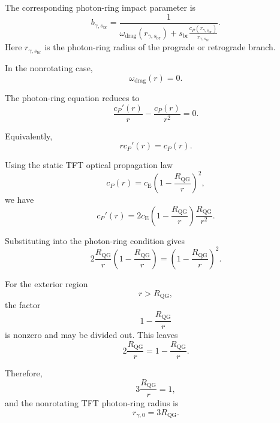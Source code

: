 The corresponding photon-ring impact parameter is
\begin{equation}
    \boxed{ b_{\gamma,s_{\mathrm{br}}} = \frac{1}{ \omega_{\mathrm{drag}}(r_{\gamma,s_{\mathrm{br}}}) + s_{\mathrm{br}}\frac{c_P(r_{\gamma,s_{\mathrm{br}}})}{r_{\gamma,s_{\mathrm{br}}}} }. }
\end{equation}
Here $r_{\gamma,s_{\mathrm{br}}}$ is the photon-ring radius of the prograde or retrograde branch.

In the nonrotating case,
\begin{equation}
    \omega_{\mathrm{drag}}(r) = 0.
\end{equation}

The photon-ring equation reduces to
\begin{equation}
    \frac{c_P'(r)}{r} - \frac{c_P(r)}{r^2} = 0.
\end{equation}

Equivalently,
\begin{equation}
    r c_P'(r) = c_P(r).
\end{equation}

Using the static TFT optical propagation law
\begin{equation}
    c_P(r) = c_{\mathrm{E}} \left( 1-\frac{R_{\mathrm{QG}}}{r} \right)^2,
\end{equation}
we have
\begin{equation}
    c_P'(r) = 2c_{\mathrm{E}} \left( 1-\frac{R_{\mathrm{QG}}}{r} \right) \frac{R_{\mathrm{QG}}}{r^2}.
\end{equation}

Substituting into the photon-ring condition gives
\begin{equation}
    2 \frac{R_{\mathrm{QG}}}{r} \left( 1-\frac{R_{\mathrm{QG}}}{r} \right) = \left( 1-\frac{R_{\mathrm{QG}}}{r} \right)^2.
\end{equation}

For the exterior region
\begin{equation}
    r > R_{\mathrm{QG}},
\end{equation}
the factor
\begin{equation}
    1 - \frac{R_{\mathrm{QG}}}{r}
\end{equation}
is nonzero and may be divided out. This leaves
\begin{equation}
    2\frac{R_{\mathrm{QG}}}{r} = 1 - \frac{R_{\mathrm{QG}}}{r}.
\end{equation}

Therefore,
\begin{equation}
    3\frac{R_{\mathrm{QG}}}{r} = 1,
\end{equation}
and the nonrotating TFT photon-ring radius is
\begin{equation}
    \boxed{ r_{\gamma,0} = 3R_{\mathrm{QG}}. }
\end{equation}

